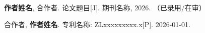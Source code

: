 \begin{publications}
  \item \textbf{作者姓名}, 合作者. 论文题目[J]. 期刊名称, 2026. （已录用/在审）
  \item 合作者, \textbf{作者姓名}. 专利名称: ZLxxxxxxxxx.x[P]. 2026-01-01.
\end{publications}
